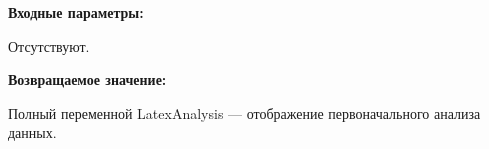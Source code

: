 \textbf{Входные параметры:}

Отсутствуют.

\textbf{Возвращаемое значение:}

Полный переменной LatexAnalysis --- отображение первоначального анализа данных.